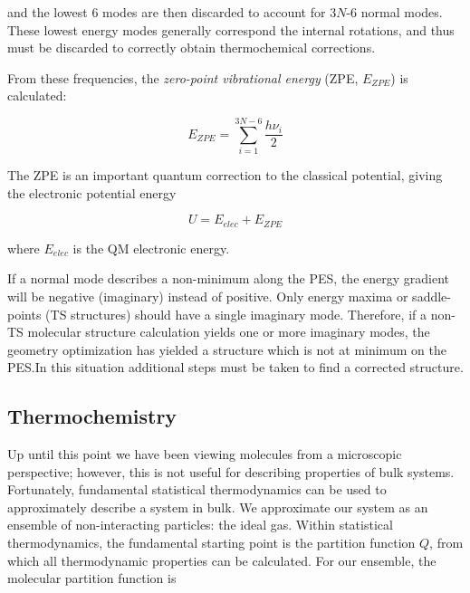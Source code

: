 \noindent and the lowest 6 modes are then discarded to account for 3$N$-6
normal modes. These lowest energy modes generally correspond the internal
rotations, and thus must be discarded to correctly obtain thermochemical
corrections.

From these frequencies, the \emph{zero-point vibrational energy} (ZPE,
$E_{ZPE}$) is calculated:

\begin{equation}
  E_{ZPE} = \sum_{i=1}^{3N-6} \frac{h\nu_i}{2}
\end{equation}

\noindent The ZPE is an important quantum correction to the classical
potential, giving the electronic potential energy

\begin{equation}
U = E_{elec} + E_{ZPE}
\end{equation}

\noindent where $E_{elec}$ is the QM electronic energy.

If a normal mode describes a non-minimum along the PES, the energy gradient
will be negative (imaginary) instead of positive. Only energy maxima or
saddle-points (TS structures) should have a single imaginary mode. Therefore,
if a non-TS molecular structure calculation yields one or more imaginary modes,
the geometry optimization has yielded a structure which is not at minimum on
the PES.\@ In this situation additional steps must be taken to find a corrected
structure.

\subsection{Thermochemistry}

Up until this point we have been viewing molecules from a microscopic
perspective; however, this is not useful for describing properties of bulk
systems. Fortunately, fundamental statistical thermodynamics can be used to
approximately describe a system in bulk.\cite{McQuarrie1999,McQuarrie2000} We
approximate our system as an ensemble of non-interacting particles: the ideal
gas. Within statistical thermodynamics, the fundamental starting point is the
partition function $Q$, from which all thermodynamic
properties can be calculated. For our ensemble, the molecular partition
function is

